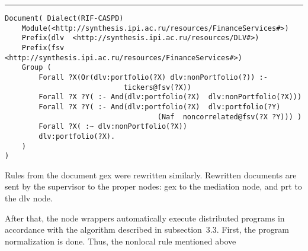 \hrule

{\small
  \begin{verbatim}
Document( Dialect(RIF-CASPD)
    Module(<http://synthesis.ipi.ac.ru/resources/FinanceServices#>)
    Prefix(dlv  <http://synthesis.ipi.ac.ru/resources/DLV#>)
    Prefix(fsv  <http://synthesis.ipi.ac.ru/resources/FinanceServices#>)
    Group (
        Forall ?X(Or(dlv:portfolio(?X) dlv:nonPortfolio(?)) :-
                            tickers@fsv(?X))
        Forall ?X ?Y( :- And(dlv:portfolio(?X)  dlv:nonPortfolio(?X)))
        Forall ?X ?Y( :- And(dlv:portfolio(?X)  dlv:portfolio(?Y)
                                    (Naf  noncorrelated@fsv(?X ?Y))) )
        Forall ?X( :~ dlv:nonPortfolio(?X))
        dlv:portfolio(?X).
    )
)
\end{verbatim}
}





{\small
  Rules from the document {\sf gex} were rewritten similarly. Rewritten
documents are sent by the supervisor to the proper nodes: {\sf gex} to the
mediation node, and {\sf prt}  to the {\sf dlv} node.

  After that, the node wrappers automatically execute distributed programs in
accordance with the algorithm described in subsection~3.3. First, the program
normalization is done. Thus, the nonlocal rule mentioned above}

